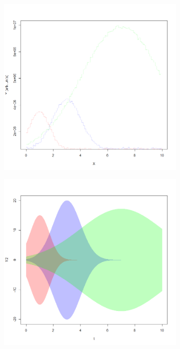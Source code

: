 \documentclass{article}
\begin{document}
 \begin{figure}[h]
	\centering
	\begin{subfigure}[t]{0.32\textwidth}
		\centering
		\includegraphics[width=\linewidth]{Proof_Concept_noisy_list_xbox.png}
		\label{F3a}
	\end{subfigure}
	\hfill
	\begin{subfigure}[t]{0.32\textwidth}
		\centering
		\includegraphics[width=\linewidth]{Proof_Concept_noiseless.png}

\end{subfigure}
\end{figure}
\end{document}
